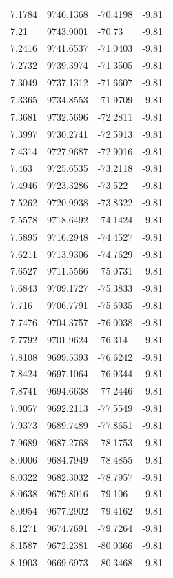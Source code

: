 \begin{table}[H]
\begin{tabular}{llll}
7.1784 & 9746.1368 & -70.4198 & -9.81 \\
7.21 & 9743.9001 & -70.73 & -9.81 \\
7.2416 & 9741.6537 & -71.0403 & -9.81 \\
7.2732 & 9739.3974 & -71.3505 & -9.81 \\
7.3049 & 9737.1312 & -71.6607 & -9.81 \\
7.3365 & 9734.8553 & -71.9709 & -9.81 \\
7.3681 & 9732.5696 & -72.2811 & -9.81 \\
7.3997 & 9730.2741 & -72.5913 & -9.81 \\
7.4314 & 9727.9687 & -72.9016 & -9.81 \\
7.463 & 9725.6535 & -73.2118 & -9.81 \\
7.4946 & 9723.3286 & -73.522 & -9.81 \\
7.5262 & 9720.9938 & -73.8322 & -9.81 \\
7.5578 & 9718.6492 & -74.1424 & -9.81 \\
7.5895 & 9716.2948 & -74.4527 & -9.81 \\
7.6211 & 9713.9306 & -74.7629 & -9.81 \\
7.6527 & 9711.5566 & -75.0731 & -9.81 \\
7.6843 & 9709.1727 & -75.3833 & -9.81 \\
7.716 & 9706.7791 & -75.6935 & -9.81 \\
7.7476 & 9704.3757 & -76.0038 & -9.81 \\
7.7792 & 9701.9624 & -76.314 & -9.81 \\
7.8108 & 9699.5393 & -76.6242 & -9.81 \\
7.8424 & 9697.1064 & -76.9344 & -9.81 \\
7.8741 & 9694.6638 & -77.2446 & -9.81 \\
7.9057 & 9692.2113 & -77.5549 & -9.81 \\
7.9373 & 9689.7489 & -77.8651 & -9.81 \\
7.9689 & 9687.2768 & -78.1753 & -9.81 \\
8.0006 & 9684.7949 & -78.4855 & -9.81 \\
8.0322 & 9682.3032 & -78.7957 & -9.81 \\
8.0638 & 9679.8016 & -79.106 & -9.81 \\
8.0954 & 9677.2902 & -79.4162 & -9.81 \\
8.1271 & 9674.7691 & -79.7264 & -9.81 \\
8.1587 & 9672.2381 & -80.0366 & -9.81 \\
8.1903 & 9669.6973 & -80.3468 & -9.81 \\

\end{tabular}
\end{table}
